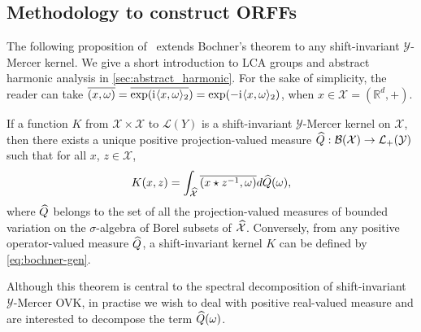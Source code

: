 \documentclass[twoside,11pt]{article}
\newcommand{\bmL}{\mathcal{L}}
\begin{document}
\subsection{Methodology to construct ORFFs}
\label{sec:theoretical_study}
The following proposition of~\citet{Zhang2012, neeb1998operator} extends
Bochner's theorem to any shift-invariant $\mathcal{Y}$-Mercer kernel. We give a
short introduction to \acs{LCA} groups and abstract harmonic analysis in
\cref{sec:abstract_harmonic}. For the sake of simplicity, the reader can take
$\overline{(x,\omega)}=\overline{\exp({\mathrm{i}\mkern1mu}\langle x,
\omega\rangle_2})=\exp(-{\mathrm{i}\mkern1mu}\langle x,\omega\rangle_2)$, when $x\in\mathcal{X}=(\mathbb{R}^d,
+)$.
\begin{proposition}
    \label{pr:operator_valued_bochner}
    If a function $K$ from $\mathcal{X} \times \mathcal{X}$ to $\bmL(Y)$ is
    a shift-invariant $\mathcal{Y}$-Mercer kernel on $\mathcal{X}$, then there
    exists a unique positive projection-valued measure $\widehat{Q}:
    \mathcal{B}(\mathcal{X}) \to
    \mathcal{L}_+(\mathcal{Y})$ such that for all $x$, $z \in \mathcal{X}$,
    \begin{dmath}
        \label{eq:bochner-gen}
        K(x, z) = \int_{\dual{\mathcal{X}}} \conj{\pairing{x \groupop \inv{z},
        \omega}} d\dual{Q}(\omega),
    \end{dmath}
    where $\widehat{Q}$ belongs to the set of all the projection-valued measures
    of bounded variation on the $\sigma$-algebra of Borel subsets of
    $\widehat{\mathcal{X}}$. Conversely, from any positive operator-valued measure
    $\widehat{Q}$, a shift-invariant kernel $K$ can be defined by
    \cref{eq:bochner-gen}.
\end{proposition}
Although this theorem is central to the spectral decomposition of
shift-invariant $\mathcal{Y}$-Mercer \acs{OVK}, in practise we wish to deal with positive real-valued measure and are interested to decompose the term $\widehat{Q}(\omega)$.
\end{document}
